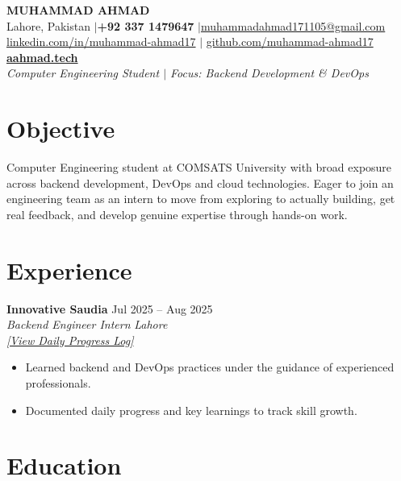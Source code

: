 \documentclass[a4paper,10.5pt]{article}
\newcommand{\entrytitle}[2]{%
  \textbf{#1} \hfill #2%
}
\newcommand{\entrysubtitle}[2]{%
  \textit{#1} \hfill \textit{#2}%
}
\begin{document}
\begin{center}
  {\sffamily\Huge\textbf{MUHAMMAD AHMAD}} \\[5pt]
  Lahore, Pakistan \enspace$|$\enspace \textbf{+92 337 1479647} \enspace$|$\enspace \href{mailto:muhammadahmad171105@gmail.com}{muhammadahmad171105@gmail.com} \\[2pt]
  \href{https://linkedin.com/in/muhammad-ahmad17}{linkedin.com/in/muhammad-ahmad17} \enspace$|$\enspace 
  \href{https://github.com/muhammad-ahmad17}{github.com/muhammad-ahmad17} \\[4pt]
  \textbf{\href{https://aahmad.tech}{aahmad.tech}} \\[3pt]
  \textit{Computer Engineering Student $|$ Focus: Backend Development \& DevOps}
\end{center}

\section{Objective}
Computer Engineering student at COMSATS University with broad exposure across backend development, DevOps and cloud technologies. Eager to join an engineering team as an intern to move from exploring to actually building, get real feedback, and develop genuine expertise through hands-on work.
\section{Experience}

\entrytitle{Innovative Saudia}{Jul 2025 -- Aug 2025} \\
\entrysubtitle{Backend Engineer Intern}{Lahore} \\
{\small\textit{\href{https://github.com/Muhammad-Ahmad17/Internship}{[View Daily Progress Log]}}}
\normalsize
\begin{itemize}[nosep, leftmargin=1.5em, topsep=2pt]
  \item Learned backend and DevOps practices under the guidance of experienced professionals.
  \item Documented daily progress and key learnings to track skill growth.
\end{itemize}

\section{Education}
\end{document}
